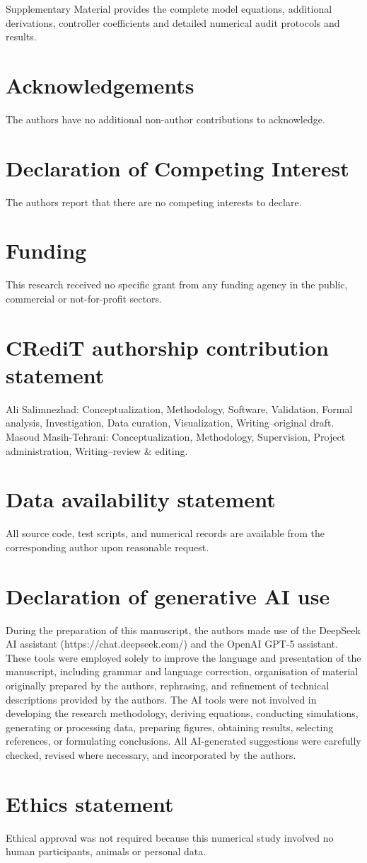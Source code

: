 \documentclass[fleqn,final,5p,times]{elsarticle}
\begin{document}
Supplementary Material provides the complete model equations, additional derivations, controller coefficients and detailed numerical audit protocols and results.

\section*{Acknowledgements}
The authors have no additional non-author contributions to acknowledge.

\section*{Declaration of Competing Interest}
The authors report that there are no competing interests to declare.

\section*{Funding}
This research received no specific grant from any funding agency in the public, commercial or not-for-profit sectors.

\section*{CRediT authorship contribution statement}
Ali Salimnezhad: Conceptualization, Methodology, Software, Validation, Formal analysis, Investigation, Data curation, Visualization, Writing--original draft. Masoud Masih-Tehrani: Conceptualization, Methodology, Supervision, Project administration, Writing--review \& editing.

\section*{Data availability statement}
All source code, test scripts, and numerical records are available from the corresponding author upon reasonable request.

\section*{Declaration of generative AI use}
During the preparation of this manuscript, the authors made use of the DeepSeek AI assistant (https://chat.deepseek.com/) and the OpenAI GPT-5 assistant. These tools were employed solely to improve the language and presentation of the manuscript, including grammar and language correction, organisation of material originally prepared by the authors, rephrasing, and refinement of technical descriptions provided by the authors. The AI tools were not involved in developing the research methodology, deriving equations, conducting simulations, generating or processing data, preparing figures, obtaining results, selecting references, or formulating conclusions. All AI-generated suggestions were carefully checked, revised where necessary, and incorporated by the authors.

\section*{Ethics statement}
Ethical approval was not required because this numerical study involved no human participants, animals or personal data.



\end{document}
